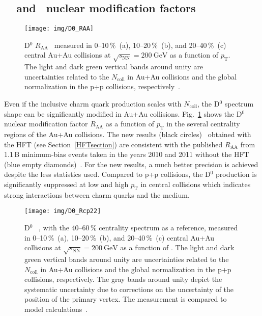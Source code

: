 \subsection{\dzero\ \Raa\ and \Rcp\ nuclear modification factors}
\begin{figure}[!htb]
\begin{center}
 \texttt{[image: img/D0\_RAA]}\\
\end{center}
\caption[D$^0$ $R_\mathrm{AA}$ measured in 0--10$\,\%$, 10--20$\,\%$, and 20--40$\,\%$ central Au+Au collisions.]{\label{dzeroRAA}D$^0$ $R_\mathrm{AA}$~\cite{D0paper} measured in 0--10$\,\%$~(a), 10--20$\,\%$~(b), and 20--40$\,\%$~(c) central Au+Au collisions at $\sqrt{s_\mathrm{NN}} = \SI{200}{\giga\electronvolt}$ as a function of $p_\mathrm{T}$\@. The
light and dark green vertical bands around unity are uncertainties related
to the $N_\mathrm{coll}$ in Au+Au collisions and the global normalization in the p+p collisions,
respectively~\cite{AuAuD0}.}
\end{figure}
Even if the inclusive charm quark production scales with $N_\mathrm{coll}$,
the D$^0$ spectrum shape can be significantly modified in Au+Au collisions. Fig.~\ref{dzeroRAA}
shows the D$^0$ nuclear modification factor
$R_\mathrm{AA}$
as a function of $p_\mathrm{T}$ in the several centrality regions of the Au+Au collisions.
The new results
(black circles)~\cite{D0paper} obtained with the HFT (see Section~\ref{HFTsection}) are consistent with the published
$R_\mathrm{AA}$ from 1.1$\,$B minimum-bias events taken in the years 2010 and 2011 
without the HFT (blue empty diamonds)~\cite{AuAuD0}\@.
For the new results, a much better precision is achieved despite the less statistics used. 
Compared to p+p collisions, the D$^0$ production is significantly suppressed at low and high $p_\mathrm{T}$ in central collisions which indicates
strong interactions between charm quarks and the medium.

\begin{figure}[!htb]
\begin{center}
 \texttt{[image: img/D0\_Rcp22]}\\
\end{center}
\caption[D$^0$ \Rcp.]{\label{dzeroRcp}D$^0$ \Rcp~\cite{D0paper}, with the 40--60$\,\%$ centrality spectrum as a reference, measured in 0--10$\,\%$~(a), 10--20$\,\%$~(b), and 20--40$\,\%$~(c) central Au+Au collisions at $\sqrt{s_\mathrm{NN}} = \SI{200}{\giga\electronvolt}$ as a function of \pt\@. The
light and dark green vertical bands around unity are uncertainties related
to the $N_\mathrm{coll}$ in Au+Au collisions and the global normalization in the p+p collisions,
respectively. The gray bands around unity depict the systematic uncertainty due to corrections on the uncertainty of the position of the primary vertex. The measurement is compared to model calculations~\cite{Duke, Duke2015, LBT, LBTprivate}.}
\end{figure}


